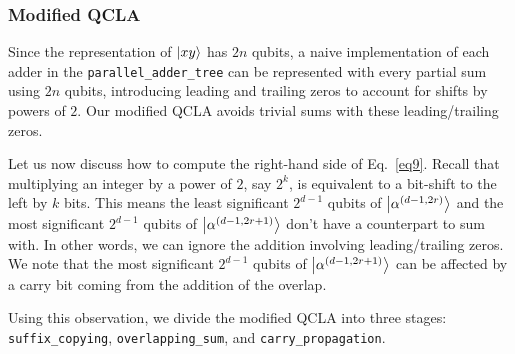 \documentclass[reprint,amsmath,amssymb,aps,pra]{revtex4-2}
\begin{document}
\subsubsection{Modified QCLA}\label{subsec:modified_qcla}

Since the representation of $\ket{xy}$ has $2n$ qubits, a naive implementation
of each adder in the \texttt{parallel\_adder\_tree} can be represented with
every partial sum using $2n$ qubits, introducing leading and trailing zeros to
account for shifts by powers of $2$. Our modified QCLA avoids trivial sums with these leading/trailing zeros.



Let us now discuss how to compute the right-hand side of Eq.~\eqref{eq9}.
%
Recall that multiplying an integer by a power of $2$, say $2^k$, is equivalent
to a bit-shift to the left by $k$ bits. This means the least significant
$2^{d-1}$ qubits of $\ket{\alpha^{(d-1,2r)}}$ and the most significant $2^{d-1}$
qubits of $\ket{\alpha^{(d-1,2r+1)}}$ don't have a counterpart to sum with. In
other words, we can ignore the addition involving leading/trailing zeros. We
note that the most significant $2^{d-1}$ qubits of $\ket{\alpha^{(d-1,2r+1)}}$
can be affected by a carry bit coming from the addition of the overlap.


Using this observation, we divide the modified QCLA into three stages:
\texttt{suffix\_copying}, \texttt{overlapping\_sum}, and \texttt{carry\_propagation}.
\end{document}
